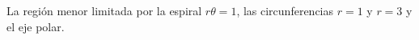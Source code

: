 \item La región menor limitada por la espiral $r\theta = 1$, las circunferencias $r = 1$ y $r = 3$ y el eje polar.
